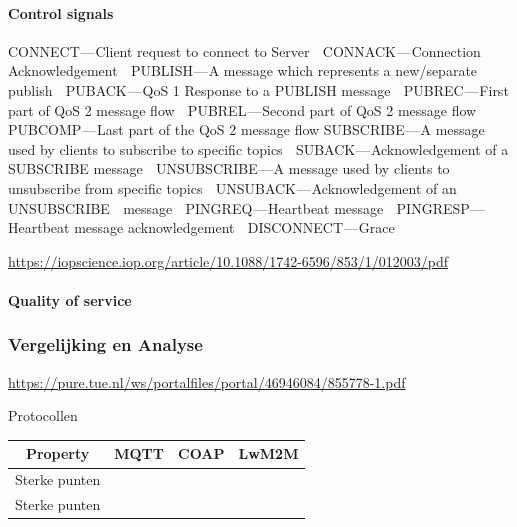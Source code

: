 \paragraph{Control signals}
CONNECT — Client request to connect to Server
 CONNACK — Connection Acknowledgement
 PUBLISH — A message which represents a new/separate publish
 PUBACK — QoS 1 Response to a PUBLISH message
 PUBREC — First part of QoS 2 message flow
 PUBREL — Second part of QoS 2 message flow
 PUBCOMP — Last part of the QoS 2 message flow
SUBSCRIBE — A message used by clients to subscribe to specific topics
 SUBACK — Acknowledgement of a SUBSCRIBE message
 UNSUBSCRIBE — A message used by clients to unsubscribe from specific topics
 UNSUBACK — Acknowledgement of an UNSUBSCRIBE
 message
 PINGREQ — Heartbeat message
 PINGRESP — Heartbeat message acknowledgement
 DISCONNECT — Grace

\url{https://iopscience.iop.org/article/10.1088/1742-6596/853/1/012003/pdf}
\subsubparagraph{}

\paragraph{Quality of service}



\subsubsection{Vergelijking en Analyse}

\url{https://pure.tue.nl/ws/portalfiles/portal/46946084/855778-1.pdf}
\begin{frame}{Protocollen}
	\begin{table}[htbp]
		\centering
		\begin{tabular}{|c|c|c|c|}\hline
			Property&MQTT&COAP&LwM2M \cite{wikibooks}\cite{wikibooks} \\\hline
			
			
			
			Sterke punten &\multicolumn{1}{m{2cm}|}{}&\multicolumn{1}{m{4cm}|}{}&
			\multicolumn{1}{m{4cm}|}{ }\\\hline
			
			Sterke punten &\multicolumn{1}{m{2cm}|}{ }&\multicolumn{1}{m{4cm}|}{}&
			\multicolumn{1}{m{4cm}|}{ }\\\hline
			
			
			
		\end{tabular}
	\end{table}
	
\end{frame}


